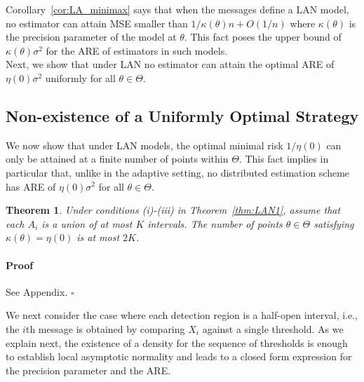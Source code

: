 \documentclass[letterpaper, 11pt]{IEEEtran}      %
\newtheorem{thm}{\bf{Theorem}}
\newenvironment{proof}{\paragraph*{Proof}}{\hfill$\square$ \newline}
\begin{document}
%
Corollary~\ref{cor:LA_minimax} says that when the messages define a LAN model, no estimator can attain MSE smaller than $1/\kappa(\theta)n + O(1/n)$ where $\kappa(\theta)$ is the precision parameter of the model at $\theta$. This fact poses the upper bound of $\kappa(\theta)\sigma^2$ for the ARE of estimators in such models. \\

Next, we show that under LAN no estimator can attain the optimal ARE of $\eta(0)\sigma^2$ uniformly for all $\theta \in \Theta$.

\subsection{Non-existence of a Uniformly Optimal Strategy}
We now show that under LAN models, the optimal minimal risk $1/\eta(0)$ can only be attained at a finite number of points within $\Theta$. This fact implies in particular that, unlike in the adaptive setting, no distributed estimation scheme has ARE of $\eta(0)\sigma^2$ for all $\theta \in \Theta$. 

\begin{thm} \label{thm:non_existence}
Under conditions (i)-(iii) in Theorem~\ref{thm:LAN1}, assume that each $A_i$ is a union of at most $K$ intervals. The number of points $\theta \in \Theta$ satisfying $\kappa(\theta) = \eta(0)$ is at most $2K$. 
\end{thm}

\begin{proof}
See Appendix. 
\end{proof}

We next consider the case where each detection region is a half-open interval, i.e., the $i$th message is obtained by comparing $X_i$ against a single threshold. As we explain next, the existence of a density for the sequence of thresholds is enough to establish local asymptotic normality and leads to a closed form expression for the precision parameter and the ARE.  

\end{document}
